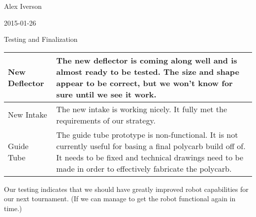 Alex Iverson

2015-01-26

Testing and Finalization

\begin{tabular}{|p{5cm}|p{5cm}|}
 \hline
 New Deflector&
 The new deflector is coming along well and is almost ready to be tested. The size and shape appear to be correct, but we won't know for sure until we see it work.\\
 \hline
 New Intake&
 The new intake is working nicely. It fully met the requirements of our strategy.\\
 \hline
 Guide Tube&
 The guide tube prototype is non-functional. It is not currently useful for basing a final polycarb build off of. It needs to be fixed and technical drawings need to be made in order to effectively fabricate the polycarb. \\
\end{tabular}

Our testing indicates that we should have greatly improved robot capabilities for our next tournament. (If we can manage to get the robot functional again in time.)
